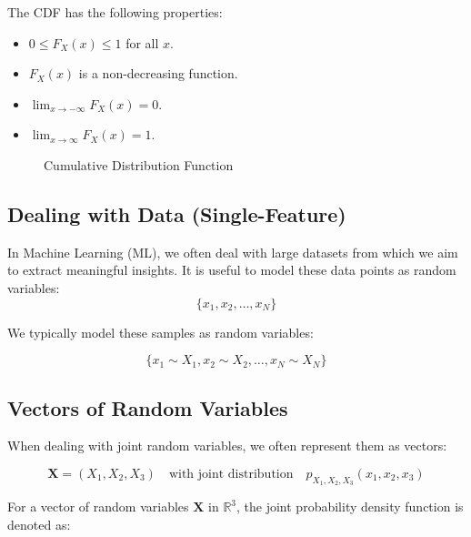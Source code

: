 The CDF has the following properties:
\begin{itemize}
    \item \(0 \leq F_X(x) \leq 1\) for all \(x\).
    \item \(F_X(x)\) is a non-decreasing function.
    \item \(\lim_{x \to -\infty} F_X(x) = 0\).
    \item \(\lim_{x \to \infty} F_X(x) = 1\).
\end{itemize}

\begin{figure}[H]
    \centering
    \caption{Cumulative Distribution Function}
\end{figure}

\subsection{Dealing with Data (Single-Feature)}

In Machine Learning (ML), we often deal with large datasets from which we aim to extract meaningful insights. It is useful to model these data points as random variables:
\[
\{x_1, x_2, \ldots, x_N\}
\]


We typically model these samples as random variables:

\[
\{x_1 \sim X_1, x_2 \sim X_2, \ldots, x_N \sim X_N\}
\]

\subsection{Vectors of Random Variables}

When dealing with joint random variables, we often represent them as vectors:

\[
\mathbf{X} = (X_1, X_2, X_3) \quad \text{with joint distribution} \quad p_{X_1, X_2, X_3}(x_1, x_2, x_3)
\]

For a vector of random variables \(\mathbf{X}\) in \(\mathbb{R}^3\), the joint probability density function is denoted as:

